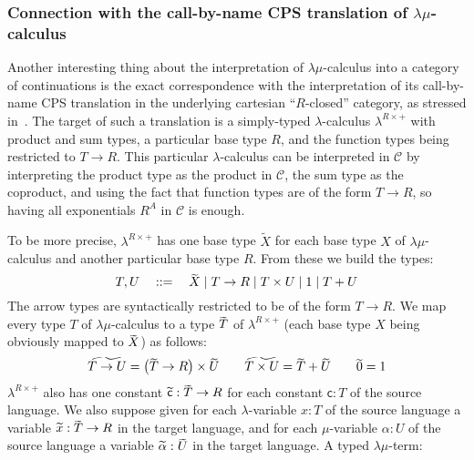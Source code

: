\documentclass{CSML}
\newcommand*\GramDef{\quad\mathrel{::=}\quad}
\newcommand*\BarSep{\mathrel{|}}
\newcommand*\LmSortBot0
\newcommand*\LmSortBase{X}
\newcommand*\LmSortTimes\times
\newcommand*\LmSortTo\to
\newcommand*\LmSortA{T}
\newcommand*\LmSortB{U}
\newcommand*\LmTerm[2]{#1\mathrel{:}#2}
\newcommand*\LmVarA{x}
\newcommand*\LmMVarA\alpha
\newcommand*\LmConst[1]{\mathsf{#1}}
\newcommand*\LmConstA{\LmConst{c}}
\newcommand*\Lam{\lambda^{R\times+}}
\newcommand*\LamTypeTo\to
\newcommand*\LamTypeTimes\times
\newcommand*\LamTypePlus{+}
\newcommand*\LamTypeUnit{1}
\newcommand*\LamTypeR{R}
\newcommand*\LamTypeA{T}
\newcommand*\LamTypeB{U}
\newcommand*\LamCPS[1]{\raisebox{0pt}[.9\height]{$\widetilde{\raisebox{0pt}[.9\height]{$#1$}}$}}
\newcommand*\CatC{\mathcal{C}}
\newcommand*\CatObjA{A}
\newcommand*\CatR{R}
\newcommand*\CatExp[2]{#1^{#2}}
\begin{document}
\subsubsection{Connection with the call-by-name CPS translation of \texorpdfstring{$\lambda\mu$}{lambda-mu}-calculus}
\label{cps}
Another interesting thing about the interpretation of $\lambda\mu$-calculus into a category of continuations is the exact correspondence with the interpretation of its call-by-name CPS translation in the underlying cartesian ``$\CatR$-closed'' category, as stressed in~\cite{StreicherContinuation}. The target of such a translation is a simply-typed $\lambda$-calculus $\Lam$ with product and sum types, a particular base type $\LamTypeR$, and the function types being restricted to $\LamTypeA\LamTypeTo\LamTypeR$. This particular $\lambda$-calculus can be interpreted in $\CatC$ by interpreting the product type as the product in $\CatC$, the sum type as the coproduct, and using the fact that function types are of the form $\LamTypeA\LamTypeTo\LamTypeR$, so having all exponentials $\CatExp{\CatR}{\CatObjA}$ in $\CatC$ is enough.\par
To be more precise, $\Lam$ has one base type $\tilde{\LmSortBase}$ for each base type $\LmSortBase$ of $\lambda\mu$-calculus and another particular base type $\LamTypeR$. From these we build the types:
$$\LamTypeA,\LamTypeB\GramDef\LamCPS{\LmSortBase}\BarSep\LamTypeA\LamTypeTo\LamTypeR\BarSep\LamTypeA\LamTypeTimes\LamTypeB\BarSep\LamTypeUnit\BarSep\LamTypeA\LamTypePlus\LamTypeB$$
The arrow types are syntactically restricted to be of the form $\LamTypeA\LamTypeTo\LamTypeR$. We map every type $\LmSortA$ of $\lambda\mu$-calculus to a type $\LamCPS{\LmSortA}$ of $\Lam$ (each base type $\LmSortBase$ being obviously mapped to $\LamCPS{\LmSortBase}$) as follows:
$$\LamCPS{\LmSortA\LmSortTo\LmSortB}=\left(\LamCPS{\LmSortA}\LamTypeTo\LamTypeR\right)\LamTypeTimes\LamCPS{\LmSortB}\qquad\LamCPS{\LmSortA\LmSortTimes\LmSortB}=\LamCPS{\LmSortA}\LamTypePlus\LamCPS{\LmSortB}\qquad\LamCPS{\LmSortBot}=\LamTypeUnit$$
$\Lam$ also has one constant $\LamCPS{\LmConstA}:\LamCPS{\LmSortA}\LamTypeTo\LamTypeR$ for each constant $\LmTerm{\LmConstA}{\LmSortA}$ of the source language. We also suppose given for each $\lambda$-variable $\LmTerm{\LmVarA}{\LmSortA}$ of the source language a variable $\LamCPS{\LmVarA}:\LamCPS{\LmSortA}\LamTypeTo\LamTypeR$ in the target language, and for each $\mu$-variable $\LmTerm{\LmMVarA}{\LmSortB}$ of the source language a variable $\LamCPS{\LmMVarA}:\LamCPS{\LmSortB}$ in the target language. A typed $\lambda\mu$-term:
\end{document}
